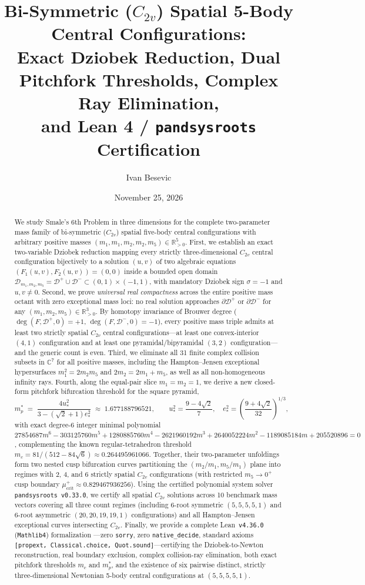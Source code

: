 \documentclass[11pt,a4paper]{amsart}
\title[Bi-Symmetric Spatial 5-Body Central Configurations]{%
Bi-Symmetric ($C_{2v}$) Spatial 5-Body Central Configurations:\\
Exact Dziobek Reduction, Dual Pitchfork Thresholds, Complex Ray Elimination,\\
and Lean 4 / \texttt{pandsysroots} Certification}
\author{Ivan Besevic}
\date{November 25, 2026}
\theoremstyle{definition}
\theoremstyle{remark}
\newcommand{\R}{\mathbb{R}}
\newcommand{\C}{\mathbb{C}}
\begin{document}
\begin{abstract}
We study Smale's 6th Problem in three dimensions for the complete two-parameter mass
family of bi-symmetric ($C_{2v}$) spatial five-body central configurations with arbitrary
positive masses $(m_1, m_1, m_2, m_2, m_5) \in \R_{>0}^5$.
First, we establish an exact two-variable Dziobek reduction mapping every strictly
three-dimensional $C_{2v}$ central configuration bijectively to a solution $(u,v)$ of
two algebraic equations $(F_1(u,v), F_2(u,v)) = (0,0)$ inside a bounded open domain
$\mathcal{D}_{m_1,m_2,m_5} = \mathcal{D}^+ \cup \mathcal{D}^- \subset (0,1) \times (-1,1)$,
with mandatory Dziobek sign $\sigma = -1$ and $u, v \neq 0$.
Second, we prove \emph{universal real compactness} across the entire positive mass
octant with zero exceptional mass loci: no real solution approaches
$\partial \mathcal{D}^+$ or $\partial \mathcal{D}^-$ for any $(m_1, m_2, m_5) \in \R_{>0}^3$.
By homotopy invariance of Brouwer degree ($\deg(F,\mathcal{D}^+,0) = +1$,
$\deg(F,\mathcal{D}^-,0) = -1$), every positive mass triple admits at least two strictly
spatial $C_{2v}$ central configurations---at least one convex-interior $(4,1)$
configuration and at least one pyramidal/bipyramidal $(3,2)$ configuration---and the
generic count is even.
Third, we eliminate all 31 finite complex collision subsets in $\C^7$ for all positive
masses, including the Hampton--Jensen exceptional hypersurfaces $m_1^2 = 2 m_2 m_5$
and $2 m_2 = 2 m_1 + m_5$, as well as all non-homogeneous infinity rays.
Fourth, along the equal-pair slice $m_1 = m_2 = 1$, we derive a new closed-form
pitchfork bifurcation threshold for the square pyramid,
\[
  m_p^* \;=\; \frac{4 u_*^2}{3 - (\sqrt{2}+1) e_*^2} \;\approx\; 1.677188796521,
  \qquad u_*^2 = \frac{9 - 4\sqrt{2}}{7}, \quad
  e_*^2 = \left(\frac{9 + 4\sqrt{2}}{32}\right)^{1/3},
\]
with exact degree-6 integer minimal polynomial
$27854687 m^6 - 303125760 m^5 + 1280885760 m^4 - 2621960192 m^3 + 2640052224 m^2
- 1189085184 m + 205520896 = 0$, complementing the known regular-tetrahedron threshold
$m_c = 81/(512 - 84\sqrt{6}) \approx 0.264495961066$.
Together, their two-parameter unfoldings form two nested cusp bifurcation curves
partitioning the $(m_2/m_1, m_5/m_1)$ plane into regimes with $2$, $4$, and $6$
strictly spatial $C_{2v}$ configurations (with restricted $m_5 \to 0^+$ cusp boundary
$\mu_{\mathrm{crit}}^+ \approx 0.829467936256$).
Using the certified polynomial system solver \texttt{pandsysroots v0.33.0}, we certify
all spatial $C_{2v}$ solutions across 10 benchmark mass vectors covering all three count
regimes (including 6-root symmetric $(5,5,5,5,1)$ and 6-root asymmetric $(20,20,19,19,1)$
configurations) and all Hampton--Jensen exceptional curves intersecting $C_{2v}$.
Finally, we provide a complete Lean~\texttt{v4.36.0} (\texttt{Mathlib4}) formalization
---zero \texttt{sorry}, zero \texttt{native\_decide}, standard axioms
\texttt{[propext, Classical.choice, Quot.sound]}---certifying the Dziobek-to-Newton
reconstruction, real boundary exclusion, complex collision-ray elimination, both exact
pitchfork thresholds $m_c$ and $m_p^*$, and the existence of six pairwise distinct,
strictly three-dimensional Newtonian 5-body central configurations at $(5,5,5,5,1)$.
\end{abstract}
\end{document}
